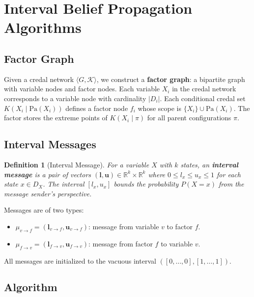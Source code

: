 \documentclass{article}
\newtheorem{definition}{Definition}
\begin{document}
\section{Interval Belief Propagation Algorithms}
\subsection{Factor Graph}

Given a credal network $\langle G, \mathcal{K} \rangle$, we construct a
\textbf{factor graph}: a bipartite graph with variable nodes and factor nodes.
Each variable $X_i$ in the credal network corresponds to a variable node with
cardinality $|D_i|$. Each conditional credal set $K(X_i \mid \mathrm{Pa}(X_i))$
defines a factor node $f_i$ whose scope is $\{X_i\} \cup \mathrm{Pa}(X_i)$.
The factor stores the extreme points of $K(X_i \mid \pi)$ for all parent
configurations $\pi$.

\subsection{Interval Messages}

\begin{definition}[Interval Message]
For a variable $X$ with $k$ states, an \textbf{interval message} is a pair of
vectors $(\mathbf{l}, \mathbf{u}) \in \mathbb{R}^k \times \mathbb{R}^k$ where
$0 \leq l_x \leq u_x \leq 1$ for each state $x \in D_X$. The interval
$[l_x, u_x]$ bounds the probability $P(X = x)$ from the message sender's
perspective.
\end{definition}

Messages are of two types:
\begin{itemize}
  \item $\mu_{v \to f} = (\mathbf{l}_{v \to f}, \mathbf{u}_{v \to f})$:
        message from variable $v$ to factor $f$.
  \item $\mu_{f \to v} = (\mathbf{l}_{f \to v}, \mathbf{u}_{f \to v})$:
        message from factor $f$ to variable $v$.
\end{itemize}

All messages are initialized to the vacuous interval $([0, \dots, 0], [1, \dots, 1])$.

\subsection{Algorithm}
\end{document}
